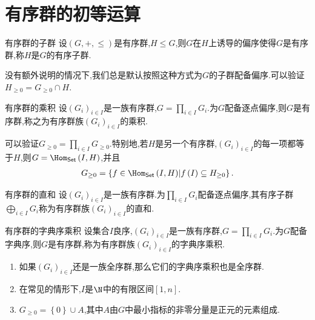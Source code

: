 \section{有序群的初等运算}

\begin{definition}{有序群的子群}{}
	设$\left(G,+,\leq\right)$是有序群,$H\leq G$,则$G$在$H$上诱导的偏序使得$G$是有序群,称$H$是$G$的有序子群.
\end{definition}

\begin{remark}{}{}
	没有额外说明的情况下,我们总是默认按照这种方式为$G$的子群配备偏序.可以验证$H_{\geq 0}=G_{\geq 0}\cap H$.
\end{remark}

\begin{definition}{有序群的乘积}{}
	设$\left(G_{i}\right)_{i\in I}$是一族有序群,$G=\prod\limits_{i\in I}G_{i}$.为$G$配备逐点偏序,则$G$是有序群,称之为有序群族$\left(G_{i}\right)_{i\in I}$的乘积.
\end{definition}

\begin{remark}{}{}
	可以验证$G_{\geq 0}=\prod\limits_{i\in I}G_{\geq 0}$.特别地,若$H$是另一个有序群,$\left(G_{i}\right)_{i\in I}$的每一项都等于$H$,则$G=\Hom_{\mathsf{Set}}\left(I,H\right)$,并且
	\begin{align*}
		G_{\geq 0}=\left\{f\in\Hom_{\mathsf{Set}}\left(I,H\right)\middle|f\left(I\right)\subseteq H_{\geq 0}\right\}.
	\end{align*}
\end{remark}

\begin{definition}{有序群的直和}{}
	设$\left(G_{i}\right)_{i\in I}$是一族有序群.为$\prod\limits_{i\in I}G_{i}$配备逐点偏序,其有序子群$\bigoplus\limits_{i\in I}G_{i}$称为有序群族$\left(G_{i}\right)_{i\in I}$的直和.
\end{definition}

\begin{definition}{有序群的字典序乘积}{}
	设集合$I$良序,$\left(G_{i}\right)_{i\in I}$是一族有序群,$G=\prod\limits_{i\in I}G_{i}$.为$G$配备字典序,则$G$是有序群,称为有序群族$\left(G_{i}\right)_{i\in I}$的字典序乘积.
\end{definition}

\begin{remark}{}{}
	\begin{enumerate}
		\item 如果$\left(G_{i}\right)_{i\in I}$还是一族全序群,那么它们的字典序乘积也是全序群.
		\item 在常见的情形下,$I$是$\N$中的有限区间$\left[1,n\right]$.
		\item $G_{\geq 0}=\left\{0\right\}\cup A$,其中$A$由$G$中最小指标的非零分量是正元的元素组成.
	\end{enumerate}
\end{remark}




















